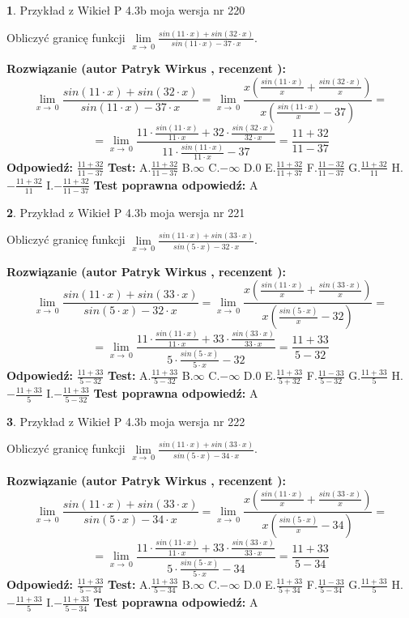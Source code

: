 \documentclass[12pt, a4paper]{article}
\theoremstyle{definition} %
\newtheorem{zad}{}
\newcommand{\zadStart}[1]{\begin{zad}#1\newline}
\newcommand{\zadStop}{\end{zad}}
\newcommand{\rozwStart}[2]{\noindent \textbf{Rozwiązanie (autor #1 , recenzent #2): }\newline}
\newcommand{\rozwStop}{\newline}
\newcommand{\odpStart}{\noindent \textbf{Odpowiedź:}\newline}
\newcommand{\odpStop}{\newline}
\newcommand{\testStart}{\noindent \textbf{Test:}\newline}
\newcommand{\testStop}{\newline}
\newcommand{\kluczStart}{\noindent \textbf{Test poprawna odpowiedź:}\newline}
\newcommand{\kluczStop}{\newline}
\begin{document}
\zadStart{Przykład z Wikieł P 4.3b moja wersja nr 220}


Obliczyć granicę funkcji $\lim\limits_{x\to\ 0}\frac{sin(11 \cdot x)+sin(32 \cdot x)}{sin(11 \cdot x)-37 \cdot x}$.
\zadStop
\rozwStart{Patryk Wirkus}{}
$$\lim\limits_{x\to\ 0}\frac{sin(11 \cdot x)+sin(32 \cdot x)}{sin(11 \cdot x)-37 \cdot x}=\lim\limits_{x\to\ 0}\frac{x(\frac{sin(11 \cdot x)}{x}+\frac{sin(32 \cdot x)}{x})}{x(\frac{sin(11 \cdot x)}{x}-37)}=$$
$$=\lim\limits_{x\to\ 0}\frac{11 \cdot \frac{sin(11 \cdot x)}{11 \cdot x}+32 \cdot \frac{sin(32 \cdot x)}{32 \cdot x}}{11 \cdot \frac{sin(11 \cdot x)}{11 \cdot x}-37}=\frac{11+32}{11-37}$$
\rozwStop
\odpStart
$\frac{11+32}{11-37}$
\odpStop
\testStart
A.$\frac{11+32}{11-37}$
B.$\infty$
C.$-\infty$
D.$0$
E.$\frac{11+32}{11+37}$
F.$\frac{11-32}{11-37}$
G.$\frac{11+32}{11}$
H.$-\frac{11+32}{11}$
I.$-\frac{11+32}{11-37}$
\testStop
\kluczStart
A
\kluczStop



\zadStart{Przykład z Wikieł P 4.3b moja wersja nr 221}


Obliczyć granicę funkcji $\lim\limits_{x\to\ 0}\frac{sin(11 \cdot x)+sin(33 \cdot x)}{sin(5 \cdot x)-32 \cdot x}$.
\zadStop
\rozwStart{Patryk Wirkus}{}
$$\lim\limits_{x\to\ 0}\frac{sin(11 \cdot x)+sin(33 \cdot x)}{sin(5 \cdot x)-32 \cdot x}=\lim\limits_{x\to\ 0}\frac{x(\frac{sin(11 \cdot x)}{x}+\frac{sin(33 \cdot x)}{x})}{x(\frac{sin(5 \cdot x)}{x}-32)}=$$
$$=\lim\limits_{x\to\ 0}\frac{11 \cdot \frac{sin(11 \cdot x)}{11 \cdot x}+33 \cdot \frac{sin(33 \cdot x)}{33 \cdot x}}{5 \cdot \frac{sin(5 \cdot x)}{5 \cdot x}-32}=\frac{11+33}{5-32}$$
\rozwStop
\odpStart
$\frac{11+33}{5-32}$
\odpStop
\testStart
A.$\frac{11+33}{5-32}$
B.$\infty$
C.$-\infty$
D.$0$
E.$\frac{11+33}{5+32}$
F.$\frac{11-33}{5-32}$
G.$\frac{11+33}{5}$
H.$-\frac{11+33}{5}$
I.$-\frac{11+33}{5-32}$
\testStop
\kluczStart
A
\kluczStop



\zadStart{Przykład z Wikieł P 4.3b moja wersja nr 222}


Obliczyć granicę funkcji $\lim\limits_{x\to\ 0}\frac{sin(11 \cdot x)+sin(33 \cdot x)}{sin(5 \cdot x)-34 \cdot x}$.
\zadStop
\rozwStart{Patryk Wirkus}{}
$$\lim\limits_{x\to\ 0}\frac{sin(11 \cdot x)+sin(33 \cdot x)}{sin(5 \cdot x)-34 \cdot x}=\lim\limits_{x\to\ 0}\frac{x(\frac{sin(11 \cdot x)}{x}+\frac{sin(33 \cdot x)}{x})}{x(\frac{sin(5 \cdot x)}{x}-34)}=$$
$$=\lim\limits_{x\to\ 0}\frac{11 \cdot \frac{sin(11 \cdot x)}{11 \cdot x}+33 \cdot \frac{sin(33 \cdot x)}{33 \cdot x}}{5 \cdot \frac{sin(5 \cdot x)}{5 \cdot x}-34}=\frac{11+33}{5-34}$$
\rozwStop
\odpStart
$\frac{11+33}{5-34}$
\odpStop
\testStart
A.$\frac{11+33}{5-34}$
B.$\infty$
C.$-\infty$
D.$0$
E.$\frac{11+33}{5+34}$
F.$\frac{11-33}{5-34}$
G.$\frac{11+33}{5}$
H.$-\frac{11+33}{5}$
I.$-\frac{11+33}{5-34}$
\testStop
\kluczStart
A
\kluczStop
\end{document}
